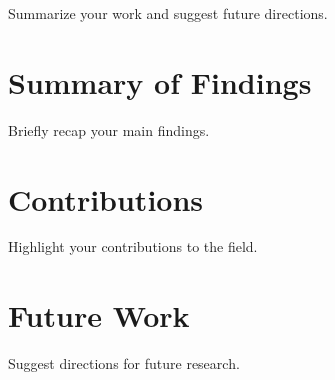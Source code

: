Summarize your work and suggest future directions.

\section{Summary of Findings}

Briefly recap your main findings.

\section{Contributions}

Highlight your contributions to the field.

\section{Future Work}

Suggest directions for future research.

\printbibliography[heading=bibintoc, title={Daftar Pustaka}]  %